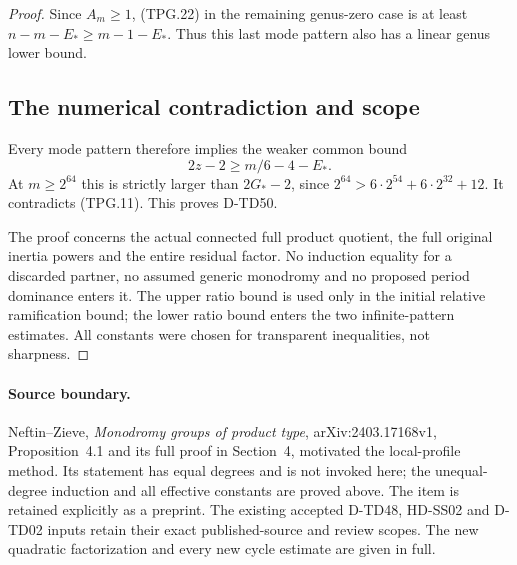 \begin{proof}
Since \(A_m\ge1\), (TPG.22) in the remaining genus-zero
case is at least \(n-m-E_*\ge m-1-E_*\).  Thus this last
mode pattern also has a linear genus lower bound.

\subsection*{The numerical contradiction and scope}

Every mode pattern therefore implies the weaker common bound
\[
                     2z-2\ge m/6-4-E_*.
 \tag{TPG.23}
\]
At \(m\ge2^{64}\) this is strictly larger than
\(2G_*-2\), since
\(2^{64}>6\cdot2^{54}+6\cdot2^{32}+12\).
It contradicts (TPG.11).  This proves D-TD50.

The proof concerns the actual connected full product quotient,
the full original inertia powers and the entire residual factor.
No induction equality for a discarded partner, no assumed
generic monodromy and no proposed period dominance enters it.
The upper ratio bound is used only in the initial relative
ramification bound; the lower ratio bound enters the two
infinite-pattern estimates.  All constants were chosen for
transparent inequalities, not sharpness.
\end{proof}

\paragraph{Source boundary.}
Neftin--Zieve, \emph{Monodromy groups of product type},
arXiv:2403.17168v1, Proposition~4.1 and its full proof in
Section~4, motivated the local-profile method.\cite{SF:NeftinZieveProduct2024}  Its statement
has equal degrees and is not invoked here; the unequal-degree
induction and all effective constants are proved above.
The item is retained explicitly as a preprint.  The existing
accepted D-TD48, HD-SS02 and D-TD02 inputs retain their exact
published-source and review scopes.  The new quadratic
factorization and every new cycle estimate are given in full.

